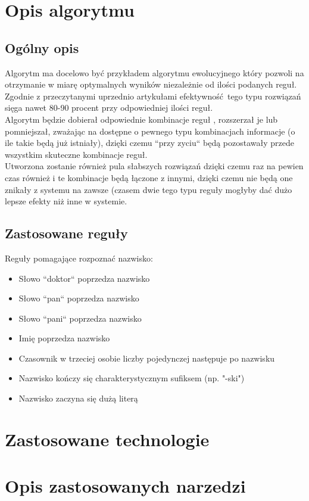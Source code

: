 \documentclass[12pt]{article}
\begin{document}
\section{Opis algorytmu}
\subsection{Ogólny opis}
Algorytm ma docelowo być przykładem algorytmu ewolucyjnego który pozwoli na otrzymanie w miarę optymalnych wyników niezależnie od ilości podanych reguł. Zgodnie z przeczytanymi uprzednio artykułami efektywność tego typu rozwiązań sięga nawet 80-90 procent przy odpowiedniej ilości reguł.
\\
Algorytm będzie dobierał odpowiednie kombinacje reguł , rozszerzał je lub pomniejszał, zważając na dostępne o pewnego typu kombinacjach informacje (o ile takie będą już istniały), dzięki czemu ``przy zyciu`` będą pozostawały przede wszystkim skuteczne kombinacje reguł.
\\
Utworzona zostanie również pula słabszych rozwiązań dzięki czemu raz na pewien czas również i te kombinacje będą łączone z innymi, dzięki czemu nie będą one znikały z systemu na zawsze (czasem dwie tego typu reguły mogłyby dać dużo lepsze efekty niż inne w systemie.
\subsection{Zastosowane reguły}
Reguły pomagające rozpoznać nazwisko:
\begin{itemize}
\item Słowo ``doktor`` poprzedza nazwisko
\item Słowo ``pan`` poprzedza nazwisko
\item Słowo ``pani`` poprzedza nazwisko
\item Imię poprzedza nazwisko
\item Czasownik w trzeciej osobie liczby pojedynczej następuje po nazwisku
\item Nazwisko kończy się charakterystycznym sufiksem (np. "-ski")
\item Nazwisko zaczyna się dużą literą
\end{itemize}

\section{Zastosowane technologie}
\section{Opis zastosowanych narzedzi}
\end{document}
